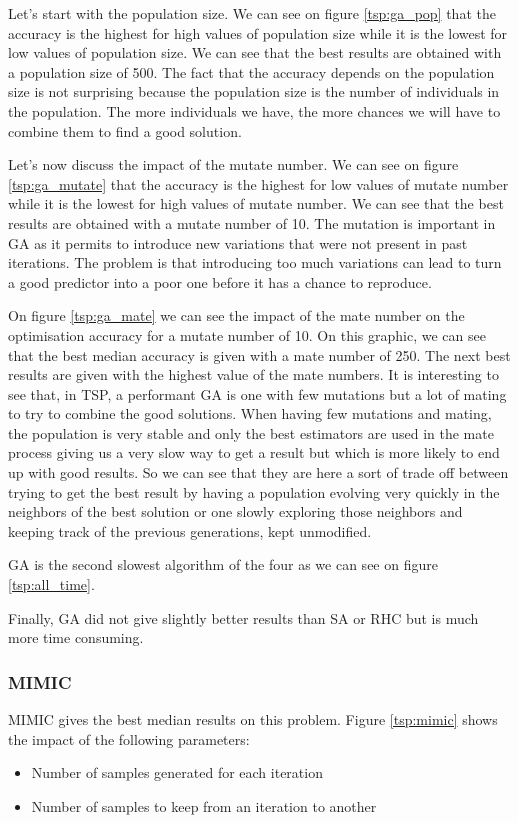 \documentclass[twocolumn, 10pt]{article}
\begin{document}
				Let's start with the population size. We can see on figure \ref{tsp:ga_pop} that the accuracy is the highest for high values of population size while it is the lowest for low values of population size. We can see that the best results are obtained with a population size of 500. The fact that the accuracy depends on the population size is not surprising because the population size is the number of individuals in the population. The more individuals we have, the more chances we will have to combine them to find a good solution.

				Let's now discuss the impact of the mutate number. We can see on figure \ref{tsp:ga_mutate} that the accuracy is the highest for low values of mutate number while it is the lowest for high values of mutate number. We can see that the best results are obtained with a mutate number of 10. The mutation is important in GA as it permits to introduce new variations that were not present in past iterations. The problem is that introducing too much variations can lead to turn a good predictor into a poor one before it has a chance to reproduce.

				On figure \ref{tsp:ga_mate} we can see the impact of the mate number on the optimisation accuracy for a mutate number of 10. On this graphic, we can see that the best median accuracy is given with a mate number of 250. The next best results are given with the highest value of the mate numbers. It is interesting to see that, in TSP, a performant GA is one with few mutations but a lot of mating to try to combine the good solutions.
				When having few mutations and mating, the population is very stable and only the best estimators are used in the mate process giving us a very slow way to get a result but which is more likely to end up with good results. So we can see that they are here a sort of trade off between trying to get the best result by having a population evolving very quickly in the neighbors of the best solution or one slowly exploring those neighbors and keeping track of the previous generations, kept unmodified.

				GA is the second slowest algorithm of the four as we can see on figure \ref{tsp:all_time}.

				Finally, GA did not give slightly better results than SA or RHC but is much more time consuming.
			\subsubsection*{MIMIC}
				MIMIC gives the best median results on this problem. Figure \ref{tsp:mimic} shows the impact of the following parameters:
				\begin{itemize}
					\item Number of samples generated for each iteration
					\item Number of samples to keep from an iteration to another
				\end{itemize}
\end{document}
